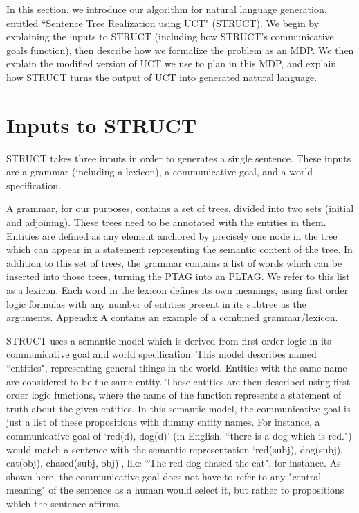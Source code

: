 In this section, we introduce our algorithm for natural language generation,
entitled ``Sentence Tree Realization using UCT" (STRUCT).  We begin
by explaining the inputs to STRUCT (including how STRUCT's communicative
goals function), then describe how we formalize the problem as an MDP.
We then explain the modified version of UCT we use to plan in this MDP, and explain
how STRUCT turns the output of UCT into generated natural language.

\section{Inputs to STRUCT}

STRUCT takes three inputs in order to generates a single sentence.
These inputs are a grammar (including a lexicon),
a communicative goal, and a world specification.

A grammar, for our purposes, contains a set of trees, divided into two sets (initial and adjoining).
These trees need to be annotated with the entities in them.  Entities are defined as any element
anchored by precisely one node in the tree which can appear in a statement representing the
semantic content of the tree.  In addition to this set of trees, the grammar contains a list of
words which can be inserted into those trees, turning the PTAG into an PLTAG.  We refer to this
list as a lexicon.  Each word in the lexicon defines its own meanings, using first order logic
formulas with any number of entities present in its subtree as the arguments.
Appendix A contains an example of a combined grammar/lexicon.

STRUCT uses a semantic model which is derived from first-order logic in its communicative
goal and world specification.  This model describes named ``entities", representing general
things in the world.  Entities with the same name are considered to be the same entity.
These entities are then described using first-order logic functions, where the
name of the function represents a statement of truth about the given entities.  In this
semantic model, the communicative goal is just a list of these propositions with dummy entity names.
For instance, a communicative goal of `red(d), dog(d)' (in English, ``there is a dog
which is red.") would match a sentence 
with the semantic representation `red(subj), dog(subj), cat(obj), chased(subj, obj)',
like ``The red dog chased the cat", for instance.
As shown here, the communicative goal does not have to refer to any "central meaning" of the sentence as a human would select it, but rather
to propositions which the sentence affirms.

